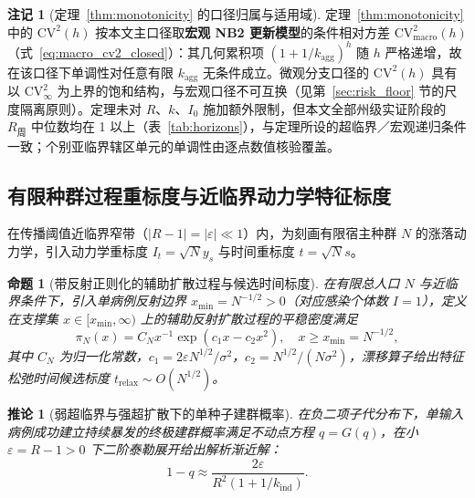 \documentclass[11pt,a4paper]{article}
\theoremstyle{plain}
\newtheorem{proposition}{命题}
\newtheorem{corollary}{推论}
\theoremstyle{definition}
\newtheorem*{remark}{注记}
\begin{document}
\begin{remark}[定理~\ref{thm:monotonicity} 的口径归属与适用域]\label{rem:monotonicity_scope}
定理~\ref{thm:monotonicity} 中的 $\text{CV}^2(h)$ 按本文主口径取\textbf{宏观 NB2 更新模型}的条件相对方差 $\text{CV}^2_{\text{macro}}(h)$（式~\eqref{eq:macro_cv2_closed}）：其几何累积项 $(1+1/k_{\text{agg}})^h$ 随 $h$ 严格递增，故在该口径下单调性对任意有限 $k_{\text{agg}}$ 无条件成立。微观分支口径的 $\text{CV}^2(h)$ 具有以 $\text{CV}^2_\infty$ 为上界的饱和结构，与宏观口径不可互换（见第~\ref{sec:risk_floor} 节的尺度隔离原则）。定理未对 $R$、$k$、$I_0$ 施加额外限制，但本文全部州级实证阶段的 $R_{\text{周}}$ 中位数均在 1 以上（表~\ref{tab:horizons}），与定理所设的超临界／宏观递归条件一致；个别亚临界辖区单元的单调性由逐点数值核验覆盖。
\end{remark}


\subsection{有限种群过程重标度与近临界动力学特征标度}\label{sec:qsd}

在传播阈值近临界窄带（$|R-1|=|\varepsilon|\ll 1$）内，为刻画有限宿主种群 $N$ 的涨落动力学，引入动力学重标度 $I_t = \sqrt{N} y_s$ 与时间重标度 $t = \sqrt{N} s$。

\begin{proposition}[带反射正则化的辅助扩散过程与候选时间标度]\label{prop:qsd}
在有限总人口 $N$ 与近临界条件下，引入单病例反射边界 $x_{\min} = N^{-1/2} > 0$（对应感染个体数 $I=1$），定义在支撑集 $x \in [x_{\min}, \infty)$ 上的辅助反射扩散过程的平稳密度满足
\begin{equation}
\pi_N(x) = C_N x^{-1} \exp(c_1 x - c_2 x^2), \quad x \ge x_{\min} = N^{-1/2}, \label{eq:qsd_density}
\end{equation}
其中 $C_N$ 为归一化常数，$c_1 = 2\varepsilon N^{1/2}/\sigma^2$，$c_2 = N^{1/2}/(N\sigma^2)$，漂移算子给出特征松弛时间候选标度 $t_{\text{relax}} \sim O(N^{1/2})$。
\end{proposition}

\begin{corollary}[弱超临界与强超扩散下的单种子建群概率]\label{cor:establishment}
在负二项子代分布下，单输入病例成功建立持续暴发的终极建群概率满足不动点方程 $q = G(q)$，在小 $\varepsilon = R-1 > 0$ 下二阶泰勒展开给出解析渐近解：
\begin{equation}
1 - q \approx \frac{2\varepsilon}{R^2(1 + 1/k_{\text{ind}})}.
\label{eq:pgf_fixed_point}
\end{equation}
\end{corollary}
\end{document}
